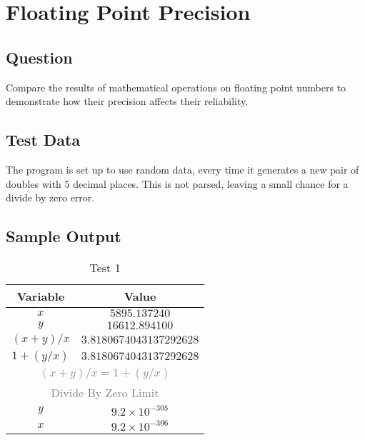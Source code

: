 \documentclass[main.tex]{subfiles}
\begin{document}
    \section{Floating Point Precision}
        \subsection{Question}
            Compare the results of mathematical operations on floating point numbers
            to demonstrate how their precision affects their reliability.

        \subsection{Test Data}
            The program is set up to use random data, every time it generates a new pair of doubles
            with 5 decimal places. This is not parsed, leaving a small chance for a divide by zero error.\\
        
        \subsection{Sample Output}
            \begin{table}[H]
                \centering
                \begin{tabular}{c c}
                    \hline
                    \textbf{Variable} & \textbf{Value} \\
                    \hline
                    \(x\) & \(5895.137240\) \\
                    \(y\) & \(16612.894100\) \\
                    \hline
                    \hline
                    \((x + y) / x\) & \(3.8180674043137292628\) \\
                    \(1 + (y / x)\) & \(3.8180674043137292628\) \\
                    \multicolumn{2}{c}{\textcolor{gray}{\((x + y) / x = 1 + ( y / x)\)}} \\
                    \hline
                    \hline
                    \multicolumn{2}{c}{\textcolor{gray}{Divide By Zero Limit}} \\
                    \(y\) & \(9.2 \times 10^{-305}\) \\
                    \(x\) & \(9.2 \times 10^{-306}\) \\
                    \hline
                \end{tabular}
                \caption{Test 1}
            \end{table}
\end{document}
